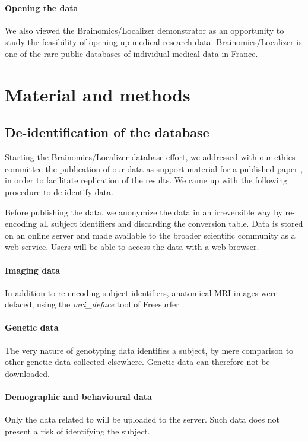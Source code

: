 \documentclass[review]{elsarticle}
\begin{document}
\paragraph{Opening the data} We also viewed the Brainomics/Localizer demonstrator
as an opportunity  to study the feasibility of opening up medical research data.
Brainomics/Localizer is one of the rare public databases of individual medical
data in France.


\section{Material and methods}

\subsection{De-identification of the database}

Starting the Brainomics/Localizer database effort, we addressed with our ethics
committee the publication of our data as support material for a published
paper \cite{Pinel2012}, in order to facilitate replication of the results. We came
up with the following procedure to de-identify data.

Before publishing the data, we anonymize the data in an irreversible way by
re-encoding all subject identifiers and discarding the conversion table. Data
is stored on an online server and made available to the broader scientific
community as a web service. Users will be able to access the data with a web
browser.

\paragraph{Imaging data} In addition to re-encoding subject identifiers,
anatomical MRI images were defaced, using the \textit{mri\_deface} tool of
Freesurfer \cite{Fischl2012}.

\paragraph{Genetic data} The very nature of genotyping data identifies a subject,
by mere comparison to other genetic data collected elsewhere. Genetic data can
therefore not be downloaded.

\paragraph{Demographic and behavioural data} Only the data related to \cite{Pinel2007}
will be uploaded to the server. Such data does not present a risk of identifying the subject.
\end{document}
